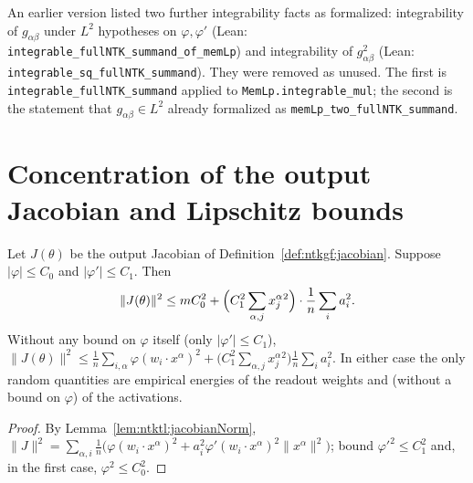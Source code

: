 \begin{remark}\label{rmk:ntktl:ntkLLNChange}
An earlier version listed two further integrability facts as formalized: integrability of $g_{\alpha\beta}$ under $L^2$ hypotheses on $\varphi,\varphi'$ (Lean: \texttt{integrable\_fullNTK\_summand\_of\_memLp}) and integrability of $g_{\alpha\beta}^2$ (Lean: \texttt{integrable\_sq\_fullNTK\_summand}). They were removed as unused. The first is \texttt{integrable\_fullNTK\_summand} applied to \texttt{MemLp.integrable\_mul}; the second is the statement that $g_{\alpha\beta}\in L^2$ already formalized as \texttt{memLp\_two\_fullNTK\_summand}.
\end{remark}



\section{Concentration of the output Jacobian and Lipschitz bounds}\label{sec:ntktl:jacobianBounds}

\begin{lemma}\label{lem:ntktl:jacobianPointwise}
  \leanok
Let $J(\theta)$ be the output Jacobian of Definition~\ref{def:ntkgf:jacobian}. Suppose $|\varphi|\le C_0$ and $|\varphi'|\le C_1$. Then
\[
  \|J(\theta)\|^2\le mC_0^2+\Bigl(C_1^2\sum_{\alpha,j}x^\alpha_j{}^2\Bigr)\cdot\frac1n\sum_ia_i^2 .
\]
Without any bound on $\varphi$ itself (only $|\varphi'|\le C_1$), $\|J(\theta)\|^2\le\frac1n\sum_{i,\alpha}\varphi(w_i\cdot x^\alpha)^2+\bigl(C_1^2\sum_{\alpha,j}x^\alpha_j{}^2\bigr)\frac1n\sum_ia_i^2$. In either case the only random quantities are empirical energies of the readout weights and (without a bound on $\varphi$) of the activations.
\end{lemma}

\begin{proof}
  \leanok
By Lemma~\ref{lem:ntktl:jacobianNorm}, $\|J\|^2=\sum_{\alpha,i}\frac1n\bigl(\varphi(w_i\cdot x^\alpha)^2+a_i^2\varphi'(w_i\cdot x^\alpha)^2\|x^\alpha\|^2\bigr)$; bound $\varphi'^2\le C_1^2$ and, in the first case, $\varphi^2\le C_0^2$.
\end{proof}

